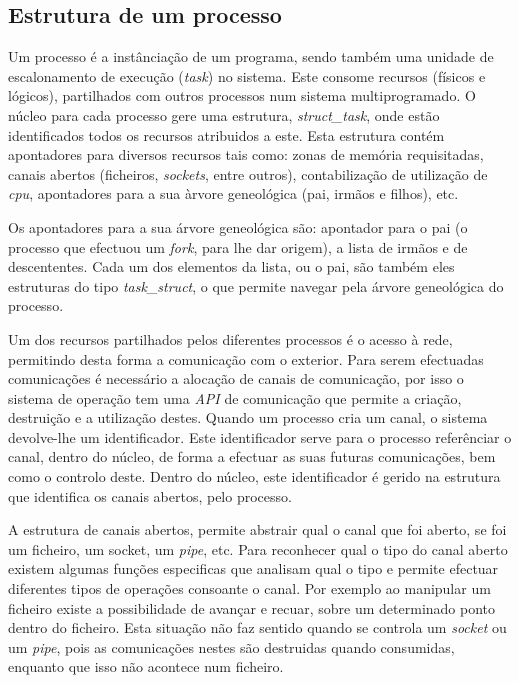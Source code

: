 
\subsection{Estrutura de um processo}

Um processo é a instânciação de um programa, sendo também uma unidade de escalonamento de execução (\textit{task}) no sistema.
Este consome recursos (físicos e lógicos), partilhados com outros processos num sistema multiprogramado.
O núcleo para cada processo gere uma estrutura, \textit{struct\_task}, onde estão identificados todos os recursos atribuidos a este.
Esta estrutura contém apontadores para diversos recursos tais como: zonas de memória requisitadas, canais abertos (ficheiros, \textit{sockets}, entre outros), contabilização de utilização de \textit{cpu}, apontadores para a sua àrvore geneológica (pai, irmãos e filhos), etc.

Os apontadores para a sua árvore geneológica são: apontador para o pai (o processo que efectuou um \textit{fork}, para lhe dar origem), a lista de irmãos e de descententes.
Cada um dos elementos da lista, ou o pai, são também eles estruturas do tipo \textit{task\_struct}, o que permite navegar pela árvore geneológica do processo.

Um dos recursos partilhados pelos diferentes processos é o acesso à rede, permitindo desta forma a comunicação com o exterior.
Para serem efectuadas comunicações é necessário a alocação de canais de comunicação, por isso o sistema de operação tem uma \textit{API} de comunicação que permite a criação, destruição e a utilização destes.
Quando um processo cria um canal, o sistema devolve-lhe um identificador.
Este identificador serve para o processo referênciar o canal, dentro do núcleo, de forma a efectuar as suas futuras comunicações, bem como o controlo deste.
Dentro do núcleo, este identificador é gerido na estrutura que identifica os canais abertos, pelo processo.

A estrutura de canais abertos, permite abstrair qual o canal que foi aberto, se foi um ficheiro, um socket, um \textit{pipe}, etc.
Para reconhecer qual o tipo do canal aberto existem algumas funções especificas que analisam qual o tipo e permite efectuar diferentes tipos de operações consoante o canal.
Por exemplo ao manipular um ficheiro existe a possibilidade de avançar e recuar, sobre um determinado ponto dentro do ficheiro.
Esta situação não faz sentido quando se controla um \textit{socket} ou um \textit{pipe}, pois as comunicações nestes são destruidas quando consumidas, enquanto que isso não acontece num ficheiro.
 

